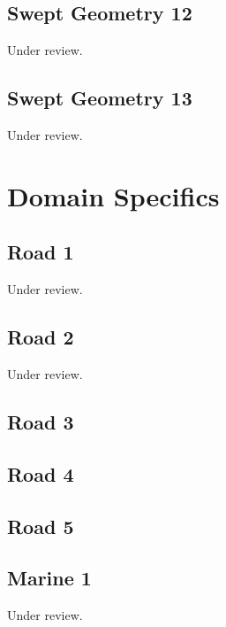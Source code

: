 \documentclass{scrartcl}
\begin{document}
\subsection{Swept Geometry 12} %
\label{sec:swept_12}
Under review.%
\clearpage

\subsection{Swept Geometry 13} %
\label{sec:swept_13}
Under review.%
\clearpage

\section{Domain Specifics}
\label{sec:domain_specifics}

\subsection{Road 1}  %
\label{sec:road_1}
Under review.%
\clearpage

\subsection{Road 2} %
\label{sec:road_2}
Under review.%
\clearpage

\subsection{Road 3} %
\label{sec:road_3}
\clearpage

\subsection{Road 4} %
\label{sec:road_4}
\clearpage

\subsection{Road 5} %
\label{sec:road_5}
\clearpage

\subsection{Marine 1} %
\label{sec:marine_1}
Under review.%
\clearpage
\end{document}
